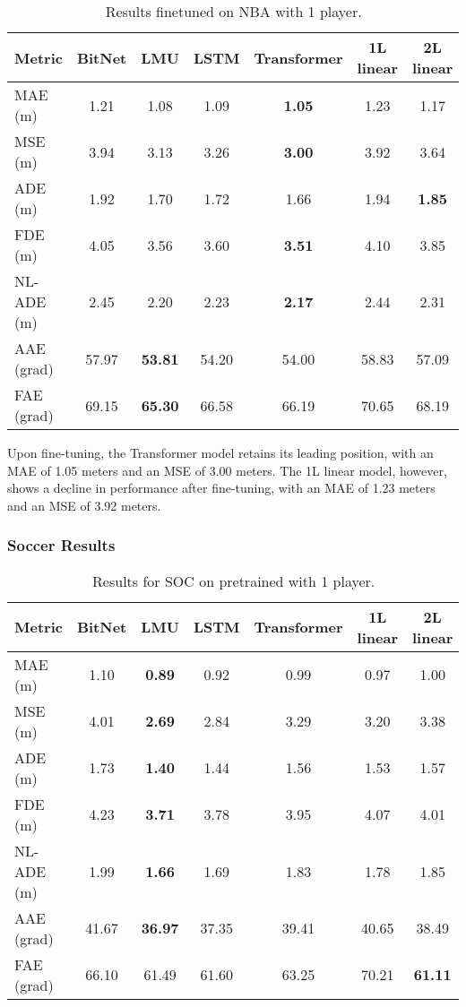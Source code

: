 \begin{table}[H]
\centering
\caption{Results finetuned on NBA with 1 player.}
\label{fine:NBA}
\begin{tabular}{l||c|c|c|c|c|c}
Metric & BitNet & LMU & LSTM & Transformer & 1L linear &  2L linear \\
\hline\hline
MAE (m) & 1.21 & 1.08 & 1.09 & \textbf{1.05} & 1.23 & 1.17 \\
MSE (m) & 3.94 & 3.13 & 3.26 & \textbf{3.00} & 3.92 & 3.64 \\
ADE (m) & 1.92 & 1.70 & 1.72 & 1.66 & 1.94 & \textbf{1.85} \\
FDE (m) & 4.05 & 3.56 & 3.60 & \textbf{3.51} & 4.10 & 3.85 \\
NL-ADE (m) & 2.45 & 2.20 & 2.23 & \textbf{2.17} & 2.44 & 2.31 \\
AAE (grad) & 57.97 & \textbf{53.81} & 54.20 & 54.00 & 58.83 & 57.09 \\
FAE (grad) & 69.15 & \textbf{65.30} & 66.58 & 66.19 & 70.65 & 68.19 \\
\end{tabular}
\end{table}

Upon fine-tuning, the Transformer model retains its leading position, with an MAE of 1.05 meters and an MSE of 3.00 meters. The 1L linear model, however, shows a decline in performance after fine-tuning, with an MAE of 1.23 meters and an MSE of 3.92 meters.

\subsubsection{Soccer Results}

\begin{table}[H]
\centering
\caption{Results for SOC on pretrained with 1 player.}
\label{pre:SOC}
\begin{tabular}{l||c|c|c|c|c|c}

Metric & BitNet & LMU & LSTM & Transformer & 1L linear & 2L linear \\
\hline\hline
MAE (m) & 1.10 & \textbf{0.89} & 0.92 & 0.99 & 0.97 & 1.00 \\
MSE (m) & 4.01 & \textbf{2.69} & 2.84 & 3.29 & 3.20 & 3.38 \\
ADE (m) & 1.73 & \textbf{1.40} & 1.44 & 1.56 & 1.53 & 1.57 \\
FDE (m) & 4.23 & \textbf{3.71} & 3.78 & 3.95 & 4.07 & 4.01 \\
NL-ADE (m) & 1.99 & \textbf{1.66} & 1.69 & 1.83 & 1.78 & 1.85 \\
AAE (grad) & 41.67 & \textbf{36.97} & 37.35 & 39.41 & 40.65 & 38.49 \\
FAE (grad) & 66.10 & 61.49 & 61.60 & 63.25 & 70.21 & \textbf{61.11} \\
\end{tabular}
\end{table}

